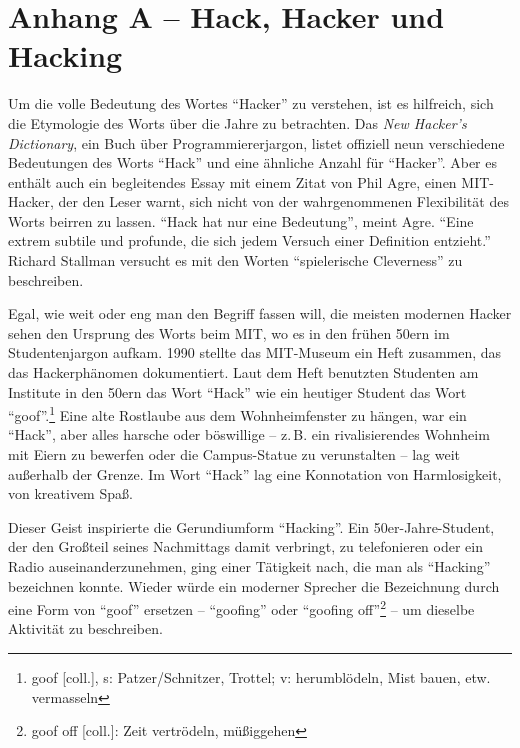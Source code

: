 \chapter{Anhang A – Hack, Hacker und Hacking}
\label{Anhang A}

Um die volle Bedeutung des Wortes "`Hacker"' zu verstehen, ist es hilfreich, sich die Etymologie des Worts über die Jahre zu betrachten.
Das \textit{New Hacker's Dictionary}, ein Buch über Programmiererjargon, listet offiziell neun verschiedene Bedeutungen des Worts "`Hack"' und eine ähnliche Anzahl für "`Hacker"'. Aber es enthält auch ein begleitendes Essay mit einem Zitat von Phil Agre, einen MIT-Hacker, der den Leser warnt, sich nicht von der wahrgenommenen Flexibilität des Worts beirren zu lassen. "`Hack hat nur eine Bedeutung"', meint Agre. "`Eine extrem subtile und profunde, die sich jedem Versuch einer Definition entzieht."' Richard Stallman versucht es mit den Worten "`spielerische Cleverness"' zu beschreiben. 

Egal, wie weit oder eng man den Begriff fassen will, die meisten modernen Hacker sehen den Ursprung des Worts beim MIT, wo es in den frühen 50ern im Studentenjargon aufkam. 1990 stellte das MIT-Museum ein Heft zusammen, das das Hackerphänomen dokumentiert. Laut dem Heft benutzten Studenten am Institute in den 50ern das Wort "`Hack"' wie ein heutiger Student das Wort "`goof"'.\footnote{goof [coll.], s: Patzer/Schnitzer, Trottel; v: herumblödeln, Mist bauen, etw. vermasseln} Eine alte Rostlaube aus dem Wohnheimfenster zu hängen, war ein "`Hack"', aber alles harsche oder böswillige – z.\,B. ein rivalisierendes Wohnheim mit Eiern zu bewerfen oder die Campus-Statue zu verunstalten – lag weit außerhalb der Grenze. Im Wort "`Hack"' lag eine Konnotation von Harmlosigkeit, von kreativem Spaß.

Dieser Geist inspirierte die Gerundiumform "`Hacking"'. Ein 50er-Jahre-Student, der den Großteil seines Nachmittags damit verbringt, zu telefonieren oder ein Radio auseinanderzunehmen, ging einer Tätigkeit nach, die man als "`Hacking"' bezeichnen konnte.
Wieder würde ein moderner Sprecher die Bezeichnung durch eine Form von "`goof"'  ersetzen – "`goofing"' oder "`goofing off"'\footnote{goof off [coll.]: Zeit vertrödeln, müßiggehen} – um dieselbe Aktivität zu beschreiben.

